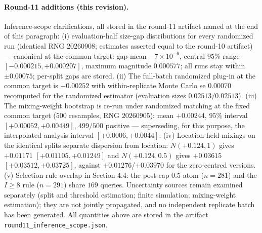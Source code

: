 \documentclass[11pt]{article}
\begin{document}
\paragraph{Round-11 additions (this revision).} Inference-scope
clarifications, all stored in the round-11 artifact named at the end
of this paragraph: (i)
evaluation-half size-gap distributions for every randomized run
(identical RNG $20260908$; estimates asserted equal to the round-10
artifact) --- canonical at the common target: gap mean
$-7\times10^{-6}$, central $95\%$ range $[-0.000215, +0.000207]$,
maximum magnitude $0.000577$; all runs stay within $\pm 0.00075$;
per-split gaps are stored. (ii) The full-batch randomized plug-in at
the common target is $+0.00252$ with within-replicate Monte Carlo se
$0.00070$ recomputed for the randomized estimator (evaluation sizes
$0.02513/0.02513$). (iii) The mixing-weight bootstrap is re-run under
randomized matching at the fixed common target ($500$ resamples, RNG
$20260905$): mean $+0.00244$, $95\%$ interval $[+0.00052, +0.00449]$,
$499/500$ positive --- superseding, for this purpose, the
interpolated-analysis interval $[+0.0006,+0.0044]$. (iv) Location-held
mixings on the identical splits separate dispersion from location:
$N(+0.124, 1)$ gives $+0.01171$ $[+0.01105,+0.01249]$ and
$N(+0.124, 0.5)$ gives $+0.03615$ $[+0.03512,+0.03725]$, against
$+0.01276$/$+0.03970$ for the zero-centred versions. (v)
Selection-rule overlap in Section 4.4: the post-cap $0.5$ atom
($n=281$) and the $I \ge 8$ rule ($n=291$) share $169$ queries.
Uncertainty sources remain examined separately (split and threshold
estimation; finite simulation; mixing-weight estimation); they are not
jointly propagated, and no independent replicate batch has been
generated. All quantities above are stored in the artifact
\texttt{round11\_\allowbreak inference\_scope.json}.
\end{document}
